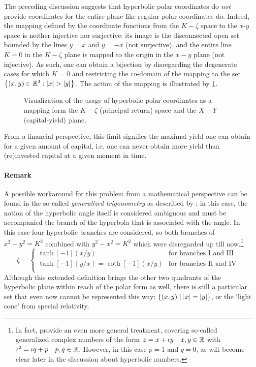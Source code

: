 The preceding discussion suggests that hyperbolic polar coordinates do \emph{not} provide coordinates for the entire plane like regular polar coordinates do. Indeed, the mapping defined by the coordinate functions from the \(K-\zeta\) space to the \(x\)-\(y\) space is neither injective nor surjective: its image is the disconnected open set bounded by the lines \(y = x\) and \(y = -x\) (not surjective), and the entire line \(K = 0\) in the \(K-\zeta\) plane is mapped to the origin in the \(x-y\) plane (not injective). As such, one can obtain a bijection by disregarding the degenerate cases for which \(K = 0\) and restricting the co-domain of the mapping to the set \(\qty{(x, y) \in \real^2: \abs{x} > \abs{y}}\). The action of the mapping is illustrated by \cref{fig:polar_coords}.
\begin{figure}[ht]
    \centering
    
    \caption{Visualization of the usage of hyperbolic polar coordinates as a mapping form the $K-\zeta$ (principal-return) space and the $X-Y$ (capital-yield) plane.}
    \label{fig:polar_coords}
\end{figure}
From a financial perspective, this limit signifies the maximal yield one can obtain for a given amount of capital, i.e. one can never obtain more yield than (re)invested capital at a given moment in time.

\paragraph{Remark} A possible workaround for this problem from a mathematical perspective can be found in the so-called \emph{generalized trigonometry} as described by \citet{Harkin2004}: in this case, the notion of the hyperbolic angle itself is considered ambiguous and must be accompanied the branch of the hyperbola that is associated with the angle. In this case four hyperbolic branches are considered, so both branches of \(x^2 - y^2 = K^2\) combined with \(y^2 - x^2 = K^2\) which were disregarded up till now.\footnote{In fact, \citeauthor{Harkin2004} provide an even more general treatment, covering so-called generalized complex numbers of the form \(z = x + \iota y\quad x, y \in \mathbb{R}\) with \(\iota^2 = \iota q + p\quad p, q \in \mathbb{R}\). However, in this case \(p = 1\) and \(q = 0\), as will become clear later in the discussion about hyperbolic numbers.}
\begin{equation}
    \zeta = 
    \begin{cases}
        \tanh[-1](x/y) & \text{for branches I and III}\\
        \tanh[-1](y/x) = \coth[-1](x/y) & \text{for branches II and IV}\\
    \end{cases}
\end{equation}
Although this extended definition brings the other two quadrants of the hyperbolic plane within reach of the polar form as well, there is still a particular set that even now cannot be represented this way: \(\qty{(x, y)\mid \abs{x} = \abs{y}}\), or the `light cone' from special relativity.

